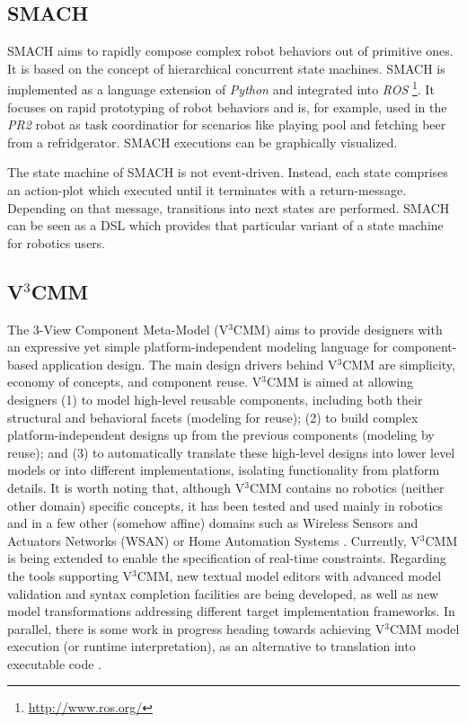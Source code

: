 \documentclass[jou]{apa}
\begin{document}
\subsection{SMACH}

SMACH \cite{Smach:2011ys} aims to rapidly compose complex robot behaviors out of primitive ones. It is based on the concept of hierarchical concurrent state machines. SMACH is implemented as a language extension of {\em Python} and integrated into {\em ROS} \footnote{\url{http://www.ros.org/}}. It focuses on rapid prototyping of robot behaviors and is, for example, used in the {\em PR2} robot as task coordinatior for scenarios like playing pool and fetching beer from a refridgerator. SMACH executions can be graphically visualized. 

The state machine of SMACH is not event-driven. Instead, each state comprises an action-plot which executed until it  terminates with a return-message. Depending on that message, transitions into next states are performed. SMACH can be seen as a DSL which provides that particular variant of a state machine for robotics users.

\subsection{V$^3$CMM}

The 3-View Component Meta-Model (V$^3$CMM) \cite{JOSER10} aims to provide designers with an expressive 
yet simple platform-independent modeling language for component-based application design. The main design 
drivers behind V$^3$CMM are simplicity, economy of concepts, and component reuse. V$^3$CMM is aimed at 
allowing designers (1) to model high-level reusable components, including both their structural and 
behavioral facets (modeling for reuse); (2) to build complex platform-independent designs up from the 
previous components (modeling by reuse); and (3) to automatically translate these high-level designs 
into lower level models or into different implementations, isolating functionality from platform  details. 
It is worth noting that, although V$^3$CMM contains no robotics (neither other domain) specific concepts, 
it has been tested and used mainly in robotics and in a few other (somehow affine) domains such as 
Wireless Sensors and Actuators Networks (WSAN) \cite{IJCIS07} or Home Automation Systems \cite{IEEESoftware09}. 
Currently, V$^3$CMM is being extended to enable the specification of real-time constraints. Regarding the 
tools supporting V$^3$CMM, new textual model editors with advanced model validation and syntax completion 
facilities are being developed, as well as new model transformations addressing different target implementation 
frameworks. In parallel, there is some work in progress heading towards achieving V$^3$CMM model execution 
(or runtime interpretation), as an alternative to translation into executable code \cite{ROSYM10}.



\end{document}
